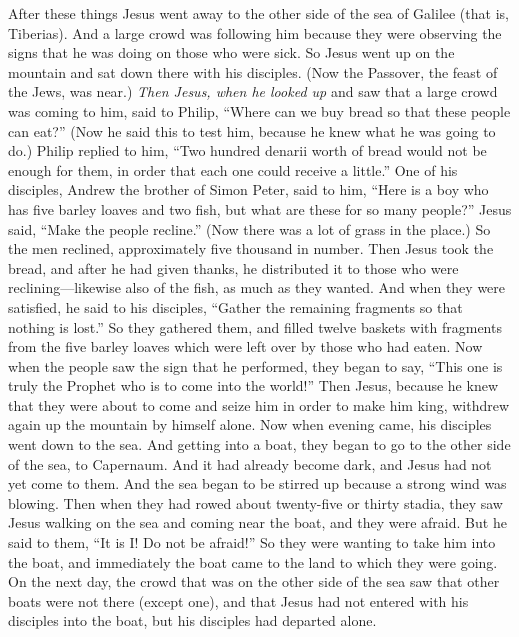 \begin{biblechapter} %
 After these things Jesus went away to the other side of the sea of Galilee (that is, Tiberias).
\verse And a large crowd was following him because they were observing the signs that he was doing on those who were sick.
\verse So Jesus went up on the mountain and sat down there with his disciples.
\verse (Now the Passover, the feast of the Jews, was near.)
\verse \textit{Then Jesus, when he looked up}  and saw that a large crowd was coming to him, said to Philip, “Where can we buy bread so that these people can eat?”
\verse (Now he said this to test him, because he knew what he was going to do.)
\verse Philip replied to him, “Two hundred denarii worth of bread would not be enough for them, in order that each one could receive a little.”
\verse One of his disciples, Andrew the brother of Simon Peter, said to him,
\verse “Here is a boy who has five barley loaves and two fish, but what are these for so many people?”
\verse Jesus said, “Make the people recline.” (Now there was a lot of grass in the place.) So the men reclined, approximately five thousand in number.
\verse Then Jesus took the bread, and after he had given thanks, he distributed it to those who were reclining—likewise also of the fish, as much as they wanted.
\verse And when they were satisfied, he said to his disciples, “Gather the remaining fragments so that nothing is lost.”
\verse So they gathered them, and filled twelve baskets with fragments from the five barley loaves which were left over by those who had eaten.
\verse Now when the people saw the sign that he performed, they began to say, “This one is truly the Prophet who is to come into the world!”
\verse Then Jesus, because he knew that they were about to come and seize him in order to make him king, withdrew again up the mountain by himself alone.
 Now when evening came, his disciples went down to the sea.
\verse And getting into a boat, they began to go to the other side of the sea, to Capernaum. And it had already become dark, and Jesus had not yet come to them.
\verse And the sea began to be stirred up because a strong wind was blowing.
\verse Then when they had rowed about twenty-five or thirty stadia, they saw Jesus walking on the sea and coming near the boat, and they were afraid.
\verse But he said to them, “It is I! Do not be afraid!”
\verse So they were wanting to take him into the boat, and immediately the boat came to the land to which they were going.
 On the next day, the crowd that was on the other side of the sea saw that other boats were not there (except one), and that Jesus had not entered with his disciples into the boat, but his disciples had departed alone.

\end{biblechapter}
